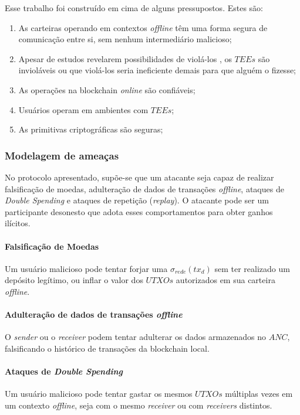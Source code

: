 \documentclass[
  12pt,
  a4paper,
  oneside,
  article,
]{abntex2}
\begin{document}
Esse trabalho foi construído em cima de alguns pressupostos. Estes são:

\begin{enumerate}
	\item As carteiras operando em contextos \textit{offline} têm uma forma segura de comunicação entre si, sem nenhum intermediário malicioso;
	\item Apesar de estudos revelarem possibilidades de violá-los \cite{skorobogatov2012}, os $TEEs$ são invioláveis ou que violá-los seria ineficiente demais para que alguém o fizesse;
	\item As operações na blockchain \textit{online} são confiáveis;
	\item Usuários operam em ambientes com $TEEs$;
	\item As primitivas criptográficas são seguras;
\end{enumerate}

\subsubsection{Modelagem de ameaças}

No protocolo apresentado, supõe-se que um atacante seja capaz de realizar falsificação de moedas, adulteração de dados de transações \textit{offline}, ataques de \textit{Double Spending} e ataques de repetição (\textit{replay}). O atacante pode ser um participante desonesto que adota esses comportamentos para obter ganhos ilícitos.

\paragraph{Falsificação de Moedas}
Um usuário malicioso pode tentar forjar uma $\sigma_{rede}(tx_d)$ sem ter realizado um depósito legítimo, ou inflar o valor dos $UTXOs$ autorizados em sua carteira \textit{offline}.

\paragraph{Adulteração de dados de transações \textit{offline}}

O \textit{sender} ou o \textit{receiver} podem tentar adulterar os dados armazenados no $ANC$, falsificando o histórico de transações da blockchain local.

\paragraph{Ataques de \textit{Double Spending}}
Um usuário malicioso pode tentar gastar os mesmos $UTXOs$ múltiplas vezes em um contexto \textit{offline}, seja com o mesmo \textit{receiver} ou com \textit{receivers} distintos.
\end{document}
